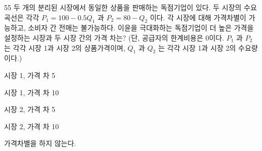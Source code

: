 \begin{question}{55}
두 개의 분리된 시장에서 동일한 상품을 판매하는 독점기업이 있다. 두 시장의 수요곡선은 각각 $P_{ 1 } =100-0.5Q_{ 1 }$ 과 $P_{ 2 } =80-Q_{ 2 }$ 이다. 각 시장에 대해 가격차별이 가능하고, 소비자 간 전매는 불가능하다. 이윤을 극대화하는 독점기업이 더 높은 가격을 설정하는 시장과 두 시장 간의 가격 차는? (단, 공급자의 한계비용은 0이다. $P_{ 1 }$ 과 $P_{ 2 }$ 는 각각 시장 1과 시장 2의 상품가격이며, $Q_{ 1 }$ 과 $Q_{ 2 }$ 는 각각 시장 1과 시장 2의 수요량이다.)
\begin{choices}
  \item 시장 1, 가격 차 5
  \item 시장 1, 가격 차 10
  \item 시장 2, 가격 차 5
  \item 시장 2, 가격 차 10
  \item 가격차별을 하지 않는다.
\end{choices}
\end{question}
